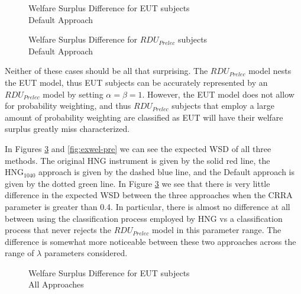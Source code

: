 \documentclass[../main.tex]{subfiles}
\begin{document}
\begin{figure}[h!]
	\center
	\caption{Welfare Surplus Difference for EUT subjects\\Default Approach}
	\label{fig:HNG1_def_wel_eut}
\end{figure}

\begin{figure}[h!]
	\center
	\caption{Welfare Surplus Difference for $\mathit{RDU_{Prelec}}$ subjects\\Default Approach}
	\label{fig:HNG1_def_wel_pre}
\end{figure}

Neither of these cases should be all that surprising.
The $\mathit{RDU_{Prelec}}$ model nests the EUT model, thus EUT subjects can be accurately represented by an $\mathit{RDU_{Prelec}}$ model by setting $\alpha = \beta = 1$.
However, the EUT model does not allow for probability weighting, and thus $\mathit{RDU_{Prelec}}$ subjects that employ a large amount of probability weighting are classified as EUT will have their welfare surplus greatly miss characterized.

In Figures \ref{fig:exwel-eut} and \ref{fig:exwel-pre} we can see the expected WSD of all three methods.
The original HNG instrument is given by the solid red line, the $\text{HNG}_{1040}$ approach is given by the dashed blue line, and the Default approach is given by the dotted green line.
In Figure \ref{fig:exwel-eut} we see that there is very little difference in the expected WSD between the three approaches when the CRRA parameter is greater than 0.4.
In particular, there is almost no difference at all between using the classification process employed by HNG vs a classification process that never rejects the $\mathit{RDU_{Prelec}}$ model in this parameter range.
The difference is somewhat more noticeable between these two approaches across the range of $\lambda$ parameters considered.

\begin{figure}[ht!]
	\center
	\caption{Welfare Surplus Difference for EUT subjects\\All Approaches}
	\label{fig:exwel-eut}
\end{figure}
\end{document}
